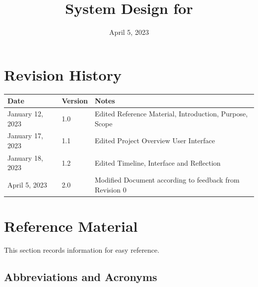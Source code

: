 \documentclass[12pt, titlepage]{article}
\begin{document}
\title{System Design for \progname{}} 
\author{\authname}
\date{April 5, 2023}

\maketitle


\section{Revision History}

\begin{tabularx}{\textwidth}{p{3cm}p{2cm}X}
\toprule {\bf Date} & {\bf Version} & {\bf Notes}\\
\midrule
January 12, 2023 & 1.0 & Edited Reference Material, Introduction, Purpose, Scope\\
January 17, 2023 & 1.1 & Edited Project Overview User Interface\\
January 18, 2023 & 1.2 & Edited Timeline, Interface and Reflection\\
April 5, 2023 & 2.0 & Modified Document according to feedback from Revision 0\\
\bottomrule
\end{tabularx}

\newpage

\section{Reference Material}

This section records information for easy reference.

\subsection{Abbreviations and Acronyms}
\end{document}
